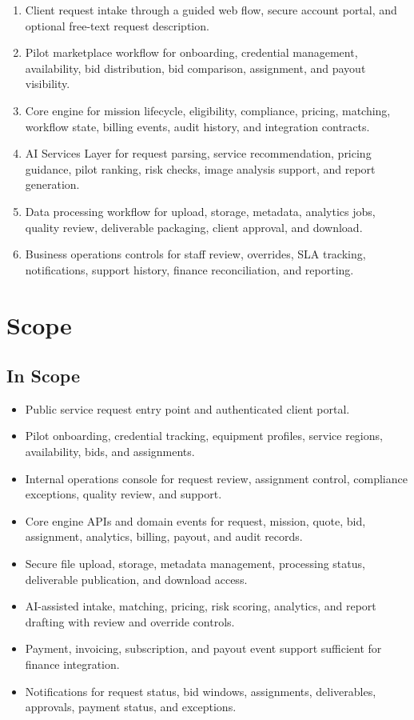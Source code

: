 \documentclass[11pt,a4paper]{article}
\begin{document}
\begin{enumerate}[leftmargin=*]
    \item Client request intake through a guided web flow, secure account portal, and optional free-text request description.
    \item Pilot marketplace workflow for onboarding, credential management, availability, bid distribution, bid comparison, assignment, and payout visibility.
    \item Core engine for mission lifecycle, eligibility, compliance, pricing, matching, workflow state, billing events, audit history, and integration contracts.
    \item AI Services Layer for request parsing, service recommendation, pricing guidance, pilot ranking, risk checks, image analysis support, and report generation.
    \item Data processing workflow for upload, storage, metadata, analytics jobs, quality review, deliverable packaging, client approval, and download.
    \item Business operations controls for staff review, overrides, SLA tracking, notifications, support history, finance reconciliation, and reporting.
\end{enumerate}

\section{Scope}

\subsection*{In Scope}

\begin{itemize}[leftmargin=*]
    \item Public service request entry point and authenticated client portal.
    \item Pilot onboarding, credential tracking, equipment profiles, service regions, availability, bids, and assignments.
    \item Internal operations console for request review, assignment control, compliance exceptions, quality review, and support.
    \item Core engine APIs and domain events for request, mission, quote, bid, assignment, analytics, billing, payout, and audit records.
    \item Secure file upload, storage, metadata management, processing status, deliverable publication, and download access.
    \item AI-assisted intake, matching, pricing, risk scoring, analytics, and report drafting with review and override controls.
    \item Payment, invoicing, subscription, and payout event support sufficient for finance integration.
    \item Notifications for request status, bid windows, assignments, deliverables, approvals, payment status, and exceptions.
\end{itemize}
\end{document}
